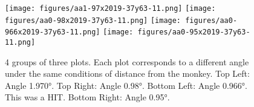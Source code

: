 \begin{figure}
    \centering
    \texttt{[image: figures/aa1-97x2019-37y63-11.png]}
    \texttt{[image: figures/aa0-98x2019-37y63-11.png]}
    \texttt{[image: figures/aa0-966x2019-37y63-11.png]}
    \texttt{[image: figures/aa0-95x2019-37y63-11.png]}
    \caption{4 groups of three plots. Each plot corresponds to a different angle under the same conditions of distance from the monkey. Top Left: Angle \ang{1.970}. Top Right: Angle \ang{0.98}. Bottom Left: Angle \ang{0.966}. This was a HIT. Bottom Right: Angle \ang{0.95}.}
    \label{fig:airDiffAngleSamePos}
\end{figure}